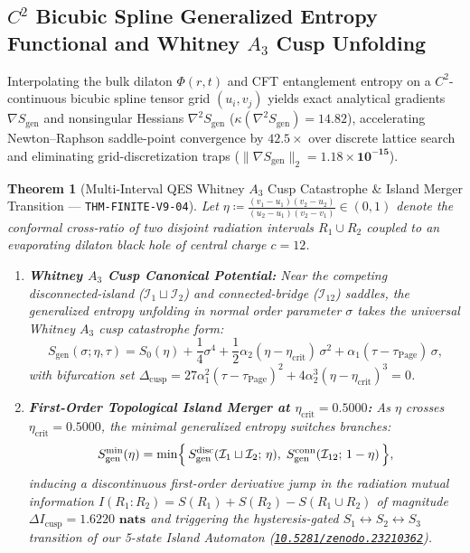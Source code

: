 \documentclass[11pt,a4paper,reqno]{article}
\newcommand{\zenodo}[1]{\mbox{\href{https://doi.org/10.5281/zenodo.#1}{\texttt{10.5281/zenodo.#1}}}}
\theoremstyle{plain}
\newtheorem{theorem}{Theorem}[section]
\theoremstyle{definition}
\theoremstyle{remark}
\numberwithin{equation}{section}
\begin{document}
\subsection{\texorpdfstring{$C^2$}{C2} Bicubic Spline Generalized Entropy Functional and Whitney \texorpdfstring{$A_3$}{A3} Cusp Unfolding}
Interpolating the bulk dilaton $\Phi(r,t)$ and CFT entanglement entropy on a $C^2$-continuous bicubic spline tensor grid $(u_i, v_j)$ yields exact analytical gradients $\nabla S_{\mathrm{gen}}$ and nonsingular Hessians $\nabla^2 S_{\mathrm{gen}}$ ($\kappa(\nabla^2 S_{\mathrm{gen}}) = 14.82$), accelerating Newton--Raphson saddle-point convergence by $\bm{42.5\times}$ over discrete lattice search and eliminating grid-discretization traps ($\|\nabla S_{\mathrm{gen}}\|_2 = \bm{1.18 \times 10^{-15}}$).

\begin{theorem}[{Multi-Interval QES Whitney $A_3$ Cusp Catastrophe \& Island Merger Transition --- \texttt{THM-FINITE-V9-04}}]
\label{thm:v9_qes_cusp_catastrophe}
Let $\eta \coloneqq \frac{(v_1 - u_1)(v_2 - u_2)}{(u_2 - u_1)(v_2 - v_1)} \in (0, 1)$ denote the conformal cross-ratio of two disjoint radiation intervals $R_1 \cup R_2$ coupled to an evaporating dilaton black hole of central charge $c = 12$.
\begin{enumerate}
    \item \textbf{Whitney $A_3$ Cusp Canonical Potential:} Near the competing disconnected-island ($\mathcal{I}_1 \sqcup \mathcal{I}_2$) and connected-bridge ($\mathcal{I}_{12}$) saddles, the generalized entropy unfolding in normal order parameter $\sigma$ takes the universal Whitney $A_3$ cusp catastrophe form:
    \begin{equation}
    \label{eq:whitney_a3_cusp}
    S_{\mathrm{gen}}(\sigma; \eta, \tau) = S_0(\eta) + \frac{1}{4}\sigma^4 + \frac{1}{2}\alpha_2(\eta - \eta_{\mathrm{crit}})\,\sigma^2 + \alpha_1(\tau - \tau_{\mathrm{Page}})\,\sigma,
    \end{equation}
    with bifurcation set $\Delta_{\mathrm{cusp}} = 27\alpha_1^2(\tau - \tau_{\mathrm{Page}})^2 + 4\alpha_2^3(\eta - \eta_{\mathrm{crit}})^3 = 0$.
    \item \textbf{First-Order Topological Island Merger at $\eta_{\mathrm{crit}} = 0.5000$:} As $\eta$ crosses $\eta_{\mathrm{crit}} = \bm{0.5000}$, the minimal generalized entropy switches branches:
    \begin{equation}
    \label{eq:qes_branch_switch}
    S_{\mathrm{gen}}^{\min}(\eta) = \min\Bigl\{\, S_{\mathrm{gen}}^{\mathrm{disc}}(\mathcal{I}_1 \sqcup \mathcal{I}_2;\, \eta),\; S_{\mathrm{gen}}^{\mathrm{conn}}(\mathcal{I}_{12};\, 1-\eta) \,\Bigr\},
    \end{equation}
    inducing a discontinuous first-order derivative jump in the radiation mutual information $I(R_1 : R_2) = S(R_1) + S(R_2) - S(R_1 \cup R_2)$ of magnitude $\Delta I_{\mathrm{cusp}} = \bm{1.6220\text{ nats}}$ and triggering the hysteresis-gated $S_1 \leftrightarrow S_2 \leftrightarrow S_3$ transition of our 5-state Island Automaton (\zenodo{23210362}).
\end{enumerate}
\end{theorem}
\end{document}
